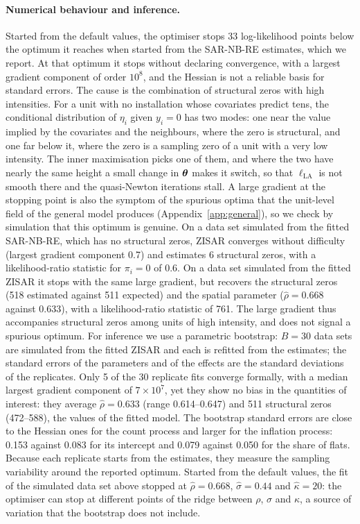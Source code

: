 \paragraph{Numerical behaviour and inference.}
Started from the default values, the optimiser stops 33 log-likelihood points below the optimum it reaches when started from the SAR-NB-RE estimates, which we report.
At that optimum it stops without declaring convergence, with a largest gradient component of order $10^8$, and the Hessian is not a reliable basis for standard errors.
The cause is the combination of structural zeros with high intensities.
For a unit with no installation whose covariates predict tens, the conditional distribution of $\eta_i$ given $y_i = 0$ has two modes: one near the value implied by the covariates and the neighbours, where the zero is structural, and one far below it, where the zero is a sampling zero of a unit with a very low intensity.
The inner maximisation picks one of them, and where the two have nearly the same height a small change in $\boldsymbol{\theta}$ makes it switch, so that $\ell_{\mathrm{LA}}$ is not smooth there and the quasi-Newton iterations stall.
A large gradient at the stopping point is also the symptom of the spurious optima that the unit-level field of the general model produces (Appendix~\ref{app:general}), so we check by simulation that this optimum is genuine.
On a data set simulated from the fitted SAR-NB-RE, which has no structural zeros, ZISAR converges without difficulty (largest gradient component 0.7) and estimates 6 structural zeros, with a likelihood-ratio statistic for $\pi_i = 0$ of 0.6.
On a data set simulated from the fitted ZISAR it stops with the same large gradient, but recovers the structural zeros (518 estimated against 511 expected) and the spatial parameter ($\hat\rho = 0.668$ against 0.633), with a likelihood-ratio statistic of 761.
The large gradient thus accompanies structural zeros among units of high intensity, and does not signal a spurious optimum.
For inference we use a parametric bootstrap: $B = 30$ data sets are simulated from the fitted ZISAR and each is refitted from the estimates; the standard errors of the parameters and of the effects are the standard deviations of the replicates.
Only 5 of the 30 replicate fits converge formally, with a median largest gradient component of $7\times 10^7$, yet they show no bias in the quantities of interest: they average $\hat\rho = 0.633$ (range 0.614--0.647) and 511 structural zeros (472--588), the values of the fitted model.
The bootstrap standard errors are close to the Hessian ones for the count process and larger for the inflation process: 0.153 against 0.083 for its intercept and 0.079 against 0.050 for the share of flats.
Because each replicate starts from the estimates, they measure the sampling variability around the reported optimum.
Started from the default values, the fit of the simulated data set above stopped at $\hat\rho = 0.668$, $\hat\sigma = 0.44$ and $\hat\kappa = 20$: the optimiser can stop at different points of the ridge between $\rho$, $\sigma$ and $\kappa$, a source of variation that the bootstrap does not include.

